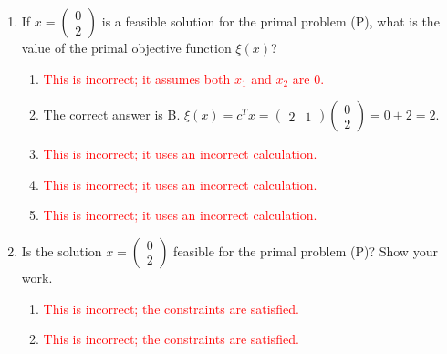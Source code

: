 \documentclass{article}%
\newcommand{\incorrect}[1]{\textcolor{red}{#1}}
\begin{document}
\begin{enumerate}
\begin{enumerate}
\begin{enumerate}
\item \incorrect{This option incorrectly uses c as the objective function coefficients and A transposed incorrectly in the constraints.}%
\item \incorrect{This option uses the correct objective function but incorrectly transposes A in the constraints.}%
\item \incorrect{This option uses the correct constraints but incorrectly uses c as the objective function coefficients.}%
\item \incorrect{This option incorrectly switches the order of b in the objective function and incorrectly transposes A in the constraints.}%
\end{enumerate}%
\vspace{0.5em}%
\item If $x = \begin{pmatrix} 0 \\ 2 \end{pmatrix}$ is a feasible solution for the primal problem (P), what is the value of the primal objective function $\xi(x)$?%
\begin{enumerate}%
\item \incorrect{This is incorrect; it assumes both $x_1$ and $x_2$ are 0.}%
\item The correct answer is B.  $\xi(x) = c^T x = \begin{pmatrix} 2 & 1 \end{pmatrix} \begin{pmatrix} 0 \\ 2 \end{pmatrix} = 0 + 2 = 2$.%
\item \incorrect{This is incorrect; it uses an incorrect calculation.}%
\item \incorrect{This is incorrect; it uses an incorrect calculation.}%
\item \incorrect{This is incorrect; it uses an incorrect calculation.}%
\end{enumerate}%
\vspace{0.5em}%
\item Is the solution $x = \begin{pmatrix} 0 \\ 2 \end{pmatrix}$ feasible for the primal problem (P)?  Show your work.%
\begin{enumerate}%
\item \incorrect{This is incorrect; the constraints are satisfied.}%
\item \incorrect{This is incorrect; the constraints are satisfied.}%

\end{enumerate}
\end{enumerate}
\end{enumerate}
\end{document}
